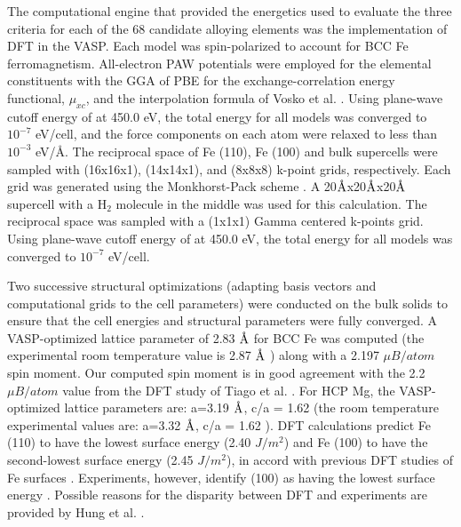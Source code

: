 The computational engine that provided the energetics used to evaluate the three criteria for each of the 68 candidate alloying elements was the implementation of \ac{DFT} in the \ac{VASP}. Each model was spin-polarized to account for \ac{BCC} Fe ferromagnetism. All-electron \ac{PAW} potentials were employed for the elemental constituents with the \ac{GGA} of \ac{PBE} for the exchange-correlation energy functional, $\mu_{xc}$, and the interpolation formula of Vosko et al. \cite{vosko1980accurate}. Using plane-wave cutoff energy of at 450.0 eV, the total energy for all models was converged to $10^{−7}$ eV/cell, and the force components on each atom were relaxed to less than $10^{−3}$ eV/Å. The reciprocal space of Fe (110), Fe (100) and bulk supercells were sampled with (16x16x1), (14x14x1), and (8x8x8) k-point grids, respectively. Each grid was generated using the Monkhorst-Pack scheme \cite{monkhorst1976special}. A 20$\mbox{\normalfont\AA}$x20$\mbox{\normalfont\AA}$x20$\mbox{\normalfont\AA}$ supercell with a $\text{H}_2$ molecule in the middle was used for this calculation. The reciprocal space was sampled with a (1x1x1) Gamma centered k-points grid. Using plane-wave cutoff energy of at 450.0 eV, the total energy for all models was converged to $10^{−7}$ eV/cell.


Two successive structural optimizations (adapting basis vectors and computational grids to the cell parameters) were conducted on the bulk solids to ensure that the cell energies and structural parameters were fully converged. A \ac{VASP}-optimized lattice parameter of 2.83 $\mbox{\normalfont\AA}$ for \ac{BCC} Fe was computed (the experimental room temperature value is 2.87 $\mbox{\normalfont\AA}$ \cite{kohlhaas1967temperature}) along with a 2.197 $\mu B/atom$ spin moment. Our computed spin moment is in good agreement with the 2.2 $\mu B/atom$ value from the \ac{DFT} study of Tiago et al. \cite{tiago2006evolution}. For \ac{HCP} Mg, the VASP-optimized lattice parameters are: a=3.19 $\mbox{\normalfont\AA}$, c/a = 1.62 (the room temperature experimental values are: a=3.32 $\mbox{\normalfont\AA}$, c/a = 1.62 \cite{wrobel2012thermodynamic}). DFT calculations predict Fe (110) to have the lowest surface energy (2.40 $J/m^2$) and Fe (100) to have the second-lowest surface energy (2.45 $J/m^2$), in accord with previous DFT studies of Fe surfaces \cite{hung2002first}.  Experiments, however, identify (100) as having the lowest surface energy \cite{tyson1977surface}. Possible reasons for the disparity between DFT and experiments are provided by Hung et al. \cite{hung2002first}.


